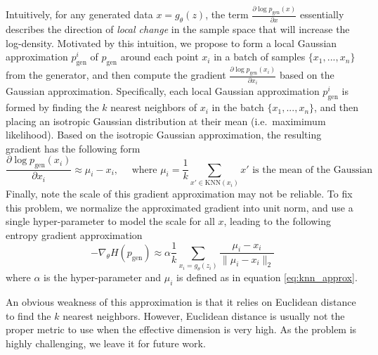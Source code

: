 \documentclass[a4paper]{article}
\newcommand{\pg}{p_\text{gen}}
\begin{document}
Intuitively, for any generated data $x = g_{\theta}(z)$, the term $\frac{\partial \log \pg(x)}{\partial x}$ essentially describes the direction of \textit{local change}
in the sample space that will increase the log-density.
Motivated by this intuition, we propose to form a local Gaussian approximation $\pg^i$ of $\pg$ around each point $x_i$ in a batch of samples $\{x_1, ..., x_n\}$ from the generator, and then compute the gradient $\frac{\partial \log \pg(x_i)}{\partial x_i}$ based on the Gaussian approximation. 
Specifically, each local Gaussian approximation $\pg^i$ is formed by finding the $k$ nearest neighbors of $x_i$ in the batch $\{x_1, ..., x_n\}$, and then placing an isotropic Gaussian distribution at their mean (i.e.~maximimum likelihood).
Based on the isotropic Gaussian approximation, the resulting gradient has the following form
\begin{equation}
\label{eq:knn_approx}
\frac{\partial \log \pg(x_i)}{\partial x_i} \approx \mu_i - x_i, \quad \text{ where } \mu_i = \frac{1}{k} \sum_{x' \in \text{KNN}(x_i)} x' \text{ is the mean of the Gaussian}
\end{equation}
Finally, note the scale of this gradient approximation may not be reliable.
To fix this problem, we normalize the approximated gradient into unit norm, and use a single hyper-parameter to model the scale for all $x$, leading to the following entropy gradient approximation
\begin{equation}
-\nabla_{\theta} H(\pg) \approx \alpha \frac{1}{k} \sum_{x_i = g_{\theta}(z_i)} \frac{\mu_i - x_i}{\|\mu_i - x_i\|_2}
\end{equation}
where $\alpha$ is the hyper-parameter and $\mu_i$ is defined as in equation \eqref{eq:knn_approx}.

An obvious weakness of this approximation is that it relies on Euclidean distance to find the $k$ nearest neighbors.
However, Euclidean distance is usually not the proper metric to use when the effective dimension is very high.
As the problem is highly challenging, we leave it for future work. 
\end{document}
